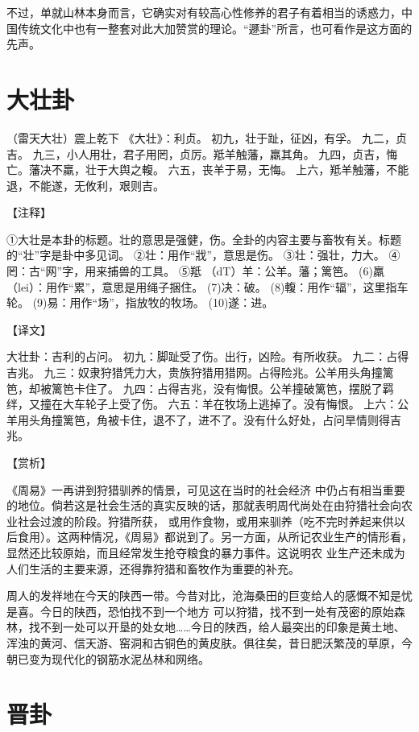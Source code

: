 \documentclass[a4paper,12pt,UTF8,twoside]{ctexbook}
\begin{document}
不过，单就山林本身而言，它确实对有较高心性修养的君子有着相当的诱惑力，中国传统文化中也有一整套对此大加赞赏的理论。“遯卦”所言，也可看作是这方面的先声。

\chapter{大壮卦}

（雷天大壮）震上乾下
《大壮》：利贞。
初九，壮于趾，征凶，有孚。
九二，贞吉。
九三，小人用壮，君子用罔，贞厉。羝羊触藩，羸其角。
九四，贞吉，悔亡。藩决不羸，壮于大舆之輹。
六五，丧羊于易，无悔。
上六，羝羊触藩，不能退，不能遂，无攸利，艰则吉。

【注释】

①大壮是本卦的标题。壮的意思是强健，伤。全卦的内容主要与畜牧有关。标题的“壮”字是卦中多见词。
②壮：用作“戕”，意思是伤。
③壮：强壮，力大。
④罔：古“网”字，用来捕兽的工具。
⑤羝 （dT）羊：公羊。藩；篱笆。
(6)羸（lei）：用作“累”，意思是用绳子捆住。
(7)决：破。
(8)輹：用作“辐”，这里指车轮。
(9)易：用作“场”，指放牧的牧场。
(10)遂：进。

【译文】

大壮卦：吉利的占问。
初九：脚趾受了伤。出行，凶险。有所收获。
九二：占得吉兆。
九三：奴隶狩猎凭力大，贵族狩猎用猎网。占得险兆。公羊用头角撞篱笆，却被篱笆卡住了。
九四：占得吉兆，没有悔恨。公羊撞破篱笆，摆脱了羁绊，又撞在大车轮子上受了伤。
六五：羊在牧场上逃掉了。没有悔恨。
上六：公羊用头角撞篱笆，角被卡住，退不了，进不了。没有什么好处，占问旱情则得吉兆。

【赏析】

《周易》一再讲到狩猎驯养的情景，可见这在当时的社会经济 中仍占有相当重要的地位。倘若这是社会生活的真实反映的话，那就表明周代尚处在由狩猎社会向农业社会过渡的阶段。狩猎所获， 或用作食物，或用来驯养（吃不完时养起来供以后食用）。这两种情况，《周易》都说到了。另一方面，从所记农业生产的情形看，显然还比较原始，而且经常发生抢夺粮食的暴力事件。这说明农 业生产还未成为人们生活的主要来源，还得靠狩猎和畜牧作为重要的补充。

周人的发祥地在今天的陕西一带。今昔对比，沧海桑田的巨变给人的感慨不知是忧是喜。今日的陕西，恐怕找不到一个地方 可以狩猎，找不到一处有茂密的原始森林，找不到一处可以开垦的处女地……今日的陕西，给人最突出的印象是黄土地、浑浊的黄河、信天游、窑洞和古铜色的黄皮肤。俱往矣，昔日肥沃繁茂的草原，今朝已变为现代化的钢筋水泥丛林和网络。

\chapter{晋卦}
\end{document}
